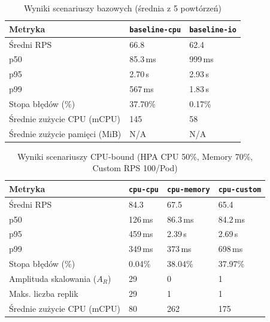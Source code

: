 \begin{table}[H]
  \centering
  \begin{tabularx}{\textwidth}{|l|X|X|}
    \hline
    \textbf{Metryka} & \texttt{baseline-cpu} & \texttt{baseline-io} \\
    \hline
    Średni RPS & 66.8 & 62.4 \\
    p50 & 85.3\,ms & 999\,ms \\
    p95 & 2.70\,s & 2.93\,s \\
    p99 & 567\,ms & 1.83\,s \\
    Stopa błędów (\%) & 37.70\% & 0.17\% \\
    Średnie zużycie CPU (mCPU) & 145 & 58 \\
    Średnie zużycie pamięci (MiB) & N/A & N/A \\
    \hline
  \end{tabularx}
  \caption{Wyniki scenariuszy bazowych (średnia z 5 powtórzeń)}
  \label{tab:baseline-results}
\end{table}

\begin{table}[H]
  \centering
  \begin{tabularx}{\textwidth}{|l|X|X|X|}
    \hline
    \textbf{Metryka} & \texttt{cpu-cpu} & \texttt{cpu-memory} & \texttt{cpu-custom} \\
    \hline
    Średni RPS & 84.3 & 67.5 & 65.4 \\
    p50 & 126\,ms & 86.3\,ms & 84.2\,ms \\
    p95 & 459\,ms & 2.39\,s & 2.69\,s \\
    p99 & 349\,ms & 373\,ms & 698\,ms \\
    Stopa błędów (\%) & 0.04\% & 38.04\% & 37.97\% \\
    Amplituda skalowania ($A_R$) & 29 & 0 & 1 \\
    Maks. liczba replik & 29 & 1 & 1 \\
    Średnie zużycie CPU (mCPU) & 80 & 262 & 175 \\
    \hline
  \end{tabularx}
  \caption{Wyniki scenariuszy CPU-bound (HPA CPU 50\%, Memory 70\%, Custom RPS 100/Pod)}
  \label{tab:cpu-results}
\end{table}

